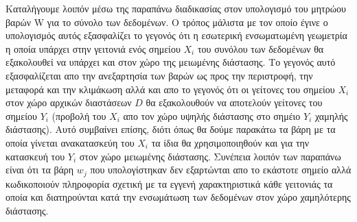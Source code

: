 \par
Καταλήγουμε λοιπόν μέσω της παραπάνω διαδικασίας στον υπολογισμό του μητρώου βαρών \textlatin{W} για το σύνολο των δεδομένων. Ο τρόπος μάλιστα με τον οποίο έγινε ο υπολογισμός αυτός εξασφαλίζει το γεγονός ότι η εσωτερική ενσωματωμένη γεωμετρία η οποία υπάρχει στην γειτονιά ενός σημείου $X_{i}$ του συνόλου των δεδομένων θα εξακολουθεί να υπάρχει και στον χώρο της μειωμένης διάστασης. Το γεγονός αυτό εξασφαλίζεται απο την ανεξαρτησία των βαρών ως προς την περιστροφή, την μεταφορά και την κλιμάκωση αλλά και απο το γεγονός ότι οι γείτονες του σημείου $X_{i}$ στον χώρο αρχικών διαστάσεων $D$ θα εξακολουθούν να αποτελούν γείτονες του σημείου $Y_{i}$ (προβολή του $X_{i}$ απο τον χώρο υψηλής διάστασης στο σημέιο $Y_{i}$ χαμηλής διάστασης). Αυτό συμβαίνει επίσης, διότι όπως θα δούμε παρακάτω τα βάρη με τα οποία γίνεται ανακατασκεύη του $X_{i}$ τα ίδια θα χρησιμοποιηθούν και για την κατασκευή του $Y_{i}$ στον χώρο μειωμένης διάστασης. Συνέπεια λοιπόν των παραπάνω είναι ότι τα βάρη $w_{j}$ που υπολογίστηκαν δεν εξαρτώνται απο το εκάστοτε σημείο αλλά κωδικοποιούν πληροφορία σχετική με τα εγγενή χαρακτηριστικά κάθε γειτονιάς τα οποία και διατηρούνται κατά την ενσωμάτωση των δεδομένων στον χώρο χαμηλότερης διάστασης. 


